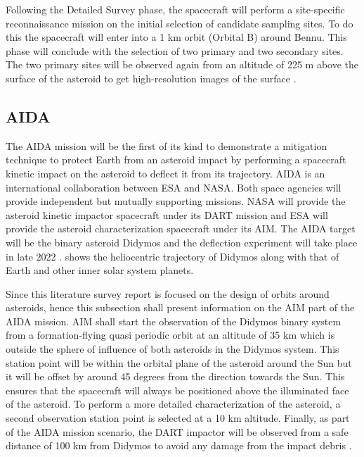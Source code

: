 Following the Detailed Survey phase, the spacecraft will perform a site-specific reconnaissance mission on the initial selection of candidate sampling sites. To do this the spacecraft will enter into a 1 km orbit (Orbital B) around Bennu. This phase will conclude with the selection of two primary and two secondary sites. The two primary sites will be observed again from an altitude of 225 m above the surface of the asteroid to get high-resolution images of the surface \cite{osiris}.

\subsection{AIDA}
\label{aida}
The \gls{AIDA} mission will be the first of its kind to demonstrate a mitigation technique to protect Earth from an asteroid impact by performing a spacecraft kinetic impact on the asteroid to deflect it from its trajectory. \gls{AIDA} is an international collaboration between \gls{ESA} and \gls{NASA}. Both space agencies will provide independent but mutually supporting missions. \gls{NASA} will provide the asteroid kinetic impactor spacecraft under its \gls{DART} mission and \gls{ESA} will provide the asteroid characterization spacecraft under its \gls{AIM}. The \gls{AIDA} target will be the binary asteroid Didymos and the deflection experiment will take place in late 2022 \cite{aida}.  shows the heliocentric trajectory of Didymos along with that of Earth and other inner solar system planets.

Since this literature survey report is focused on the design of orbits around asteroids, hence this subsection shall present information on the \gls{AIM} part of the \gls{AIDA} mission. \gls{AIM} shall start the observation of the Didymos binary system from a formation-flying quasi periodic orbit at an altitude of 35 km which is outside the sphere of influence of both asteroids in the Didymos system. This station point will be within the orbital plane of the asteroid around the Sun but it will be offset by around 45 degrees from the direction towards the Sun. This ensures that the spacecraft will always be positioned above the illuminated face of the asteroid. To perform a more detailed characterization of the asteroid, a second observation station point is selected at a 10 km altitude. Finally, as part of the \gls{AIDA} mission scenario, the \gls{DART} impactor will be observed from a safe distance of 100 km from Didymos to avoid any damage from the impact debris \cite{aida}.

